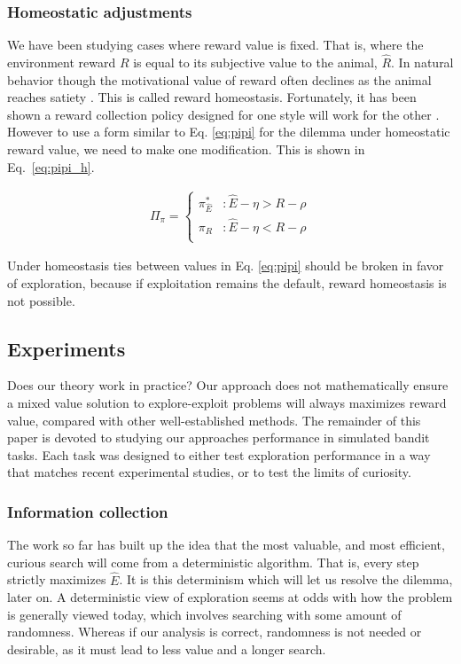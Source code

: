 \subsubsection*{Homeostatic adjustments}
We have been studying cases where reward value is fixed. That is, where the environment reward $R$ is equal to its subjective value to the animal, $\hat R$. In natural behavior though the motivational value of reward often declines as the animal reaches satiety \citep{Keramati2014,Juechems2019,Munch2020}. This is called reward homeostasis. Fortunately, it has been shown a reward collection policy designed for one style will work for the other \citep{Keramati2014}. However to use a form similar to Eq. \ref{eq:pipi} for the dilemma under homeostatic reward value, we need to make one modification. This is shown in Eq.~\ref{eq:pipi_h}. 

\begin{equation} 
    \label{eq:pipi_h}
    \begin{split}
        \Pi_{\pi} = 
        \begin{cases}
            \pi^*_{\hat{E}} & : \hat{E} - \eta > R - \rho \\
            \pi_R 	& : \hat{E} - \eta < R - \rho \\
        \end{cases}
    \end{split}
\end{equation}

Under homeostasis ties between values in Eq. \ref{eq:pipi} should be broken in favor of exploration, because if exploitation remains the default, reward homeostasis is not possible. 

\subsection*{Experiments}
Does our theory work in practice? Our approach does not mathematically ensure a mixed value solution to explore-exploit problems will always maximizes reward value, compared with other well-established methods. The remainder of this paper is devoted to studying our approaches performance in simulated bandit tasks. Each task was designed to either test exploration performance in a way that matches recent experimental studies, or to test the limits of curiosity. 

\subsubsection*{Information collection}
The work so far has built up the idea that the most valuable, and most efficient, curious search will come from a deterministic algorithm. That is, every step strictly maximizes $\hat E$. It is this determinism which will let us resolve the dilemma, later on. A deterministic view of exploration seems at odds with how the problem is generally viewed today, which involves searching with some amount of randomness. Whereas if our analysis is correct, randomness is not needed or desirable, as it must lead to less value and a longer search. 


